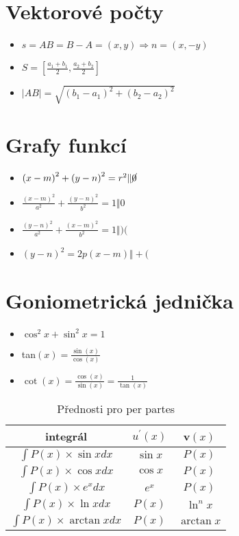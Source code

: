 \documentclass{article}
\providecommand{\tabularnewline}{\\}
\begin{document}
\begin{multicols}{4}
\section{Vektorové počty}
\begin{itemize}
    \item $s=AB=B-A=\left(x,y\right)\Longrightarrow n=\left(x,-y\right)$
    \item $S=\left[\frac{a_{1}+b_{1}}{2},\frac{a_{2}+b_{2}}{2}\right]$
    \item $\left|AB\right|=\sqrt{\left(b_{1}-a_{1}\right)^{2}+\left(b_{2}-a_{2}\right)^{2}}$
\end{itemize}
\section{Grafy funkcí}
\begin{itemize}
    \item $\left(x-m\right)^{2}+\left(y-n\right)^{2}=r^{2}\Vert\cancel{0}$
    \item $\frac{\left(x-m\right)^{2}}{a^{2}}+\frac{\left(y-n\right)^{2}}{b^{2}}=1\Vert0$
    \item $\frac{\left(y-n\right)^{2}}{a^{2}}+\frac{\left(x-m\right)^{2}}{b^{2}}=1\Vert)($
    \item $\left(y-n\right)^{2}=2p\left(x-m\right)\Vert+($
\end{itemize}
\section{Goniometrická jednička}
\begin{itemize}
    \item $\cos^{2}x+\sin^{2}x=1$
    \item tan$\left(x\right)=\frac{\sin\left(x\right)}{\cos\left(x\right)}$
    \item $\cot\left(x\right)=\frac{\cos\left(x\right)}{\sin\left(x\right)}=\frac{1}{\tan\left(x\right)}$
\end{itemize}
\end{multicols}
\begin{table}[]
    \centering
    \begin{tabular}{|c|c|c|}
    \hline 
    integrál & $u^{\prime}\left(x\right)$ & v$\left(x\right)$\tabularnewline
    \hline 
    \hline 
    $\int P\left(x\right)\times\sin xdx$ & $\sin x$ & $P\left(x\right)$\tabularnewline
    \hline 
    $\int P\left(x\right)\times\cos xdx$ & $\cos x$ & $P\left(x\right)$\tabularnewline
    \hline 
    $\int P\left(x\right)\times e^{x}dx$ & $e^{x}$ & $P\left(x\right)$\tabularnewline
    \hline 
    $\int P\left(x\right)\times\ln xdx$ & $P\left(x\right)$ & $\ln^{n}x$\tabularnewline
    \hline 
    $\int P\left(x\right)\times\arctan xdx$ & $P\left(x\right)$ & $\arctan x$\tabularnewline
    \hline 
    \end{tabular}
    \caption{Přednosti pro per partes}
    \label{tab:perpartes}
\end{table}
\end{document}
